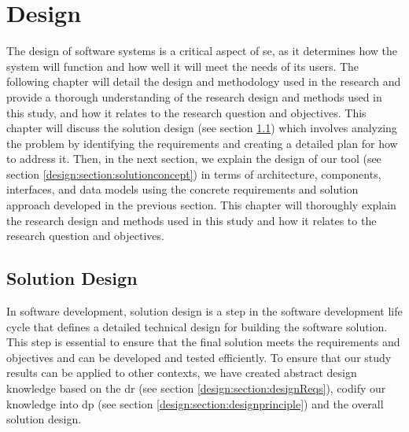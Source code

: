 
\chapter{Design}

\ifpdf
    \graphicspath{{Chapters/Design/Figs/}{Chapters/Design/Figs/}{Chapters/Design/Figs/}}
\else
    \graphicspath{{Chapters/Design/Figs/}{Chapters/Design/Figs/}}
\fi
The design of software systems is a critical aspect of \ac{se}, as it determines how the system will function and how well it will meet the needs of its users.
The following chapter will detail the design and methodology used in the research and provide a thorough understanding of the research design and methods used in this study, and how it relates to the research question and objectives.
This chapter will discuss the solution design (see section \ref{design:section:soldesign}) which involves analyzing the problem by identifying the requirements and creating a detailed plan for how to address it.
Then, in the next section, we explain the design of our tool (see section \ref{design:section:solutionconcept}) in terms of architecture, components, interfaces, and data models using the concrete requirements and solution approach developed in the previous section. 
This chapter will thoroughly explain the research design and methods used in this study and how it relates to the research question and objectives.
\section{Solution Design}
\label{design:section:soldesign}
In software development, solution design is a step in the software development life cycle that defines a detailed technical design for building the software solution.
This step is essential to ensure that the final solution meets the requirements and objectives and can be developed and tested efficiently.
To ensure that our study results can be applied to other contexts, we have created abstract design knowledge based on the \ac{dr} (see section \ref{design:section:designReqs}), codify our knowledge into \ac{dp} (see section \ref{design:section:designprinciple}) and the overall solution design.
